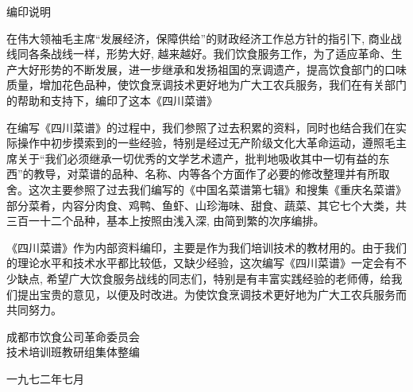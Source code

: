 \begin{center}
\Large
编印说明
\end{center}

在伟大领袖毛主席“发展经济，保障供给”的财政经济工作总方针的指引下, 商业战线同各条战线一样，形势大好, 越来越好。我们饮食服务工作，为了适应革命、生产大好形势的不断发展，进一步继承和发扬祖国的烹调遗产，提高饮食部门的口味质量，增加花色品种，使饮食烹调技术更好地为广大工农兵服务，我们在有关部门的帮助和支持下，编印了这本《四川菜谱》

在编写《四川菜谱》的过程中，我们参照了过去积累的资料，同时也结合我们在实际操作中初步摸索到的一些经验，特别是经过无产阶级文化大革命运动，遵照毛主席关于“我们必须继承一切优秀的文学艺术遗产，批判地吸收其中一切有益的东西”的教导，对菜谱的品种、名称、内等各个方面作了必要的修改整理并有所取舍。这次主要参照了过去我们编写的《中国名菜谱第七辑》和搜集《重庆名菜谱》部分菜肴，内容分肉食、鸡鸭、鱼虾、山珍海味、甜食、蔬菜、其它七个大类，共三百一十二个品种，基本上按照由浅入深, 由简到繁的次序编排。

《四川菜谱》作为内部资料编印，主要是作为我们培训技术的教材用的。由于我们的理论水平和技术水平都比较低，又缺少经验，这次编写《四川菜谱》一定会有不少缺点, 希望广大饮食服务战线的同志们，特别是有丰富实践经验的老师傅，给我们提出宝贵的意见，以便及时改进。为使饮食烹调技术更好地为广大工农兵服务而共同努力。

\begin{flushright}
成都市饮食公司革命委员会\\
技术培训班教研组集体整编

一九七二年七月
\end{flushright}

